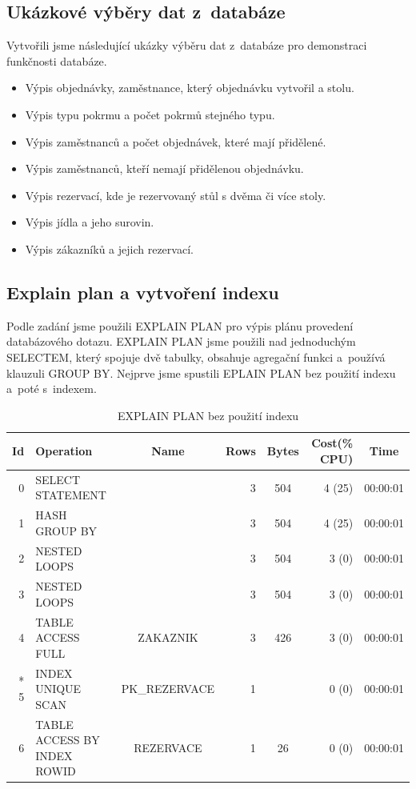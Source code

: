 \documentclass[a4paper, 12pt]{article}
\begin{document}
\subsection{Ukázkové výběry dat z~databáze}
Vytvořili jsme následující ukázky výběru dat z~databáze pro demonstraci funkčnosti databáze.
\begin{itemize}
\item Výpis objednávky, zaměstnance, který objednávku vytvořil a stolu.
\item Výpis typu pokrmu a počet pokrmů stejného typu.
\item Výpis zaměstnanců a počet objednávek, které mají přidělené.
\item Výpis zaměstnanců, kteří nemají přidělenou objednávku.
\item Výpis rezervací, kde je rezervovaný stůl s dvěma či více stoly.
\item Výpis jídla a jeho surovin.
\item Výpis zákazníků a jejich rezervací.
\end{itemize}
\subsection{Explain plan a vytvoření indexu}
Podle zadání jsme použili EXPLAIN PLAN pro výpis plánu provedení databázového dotazu. EXPLAIN PLAN jsme použili nad jednoduchým SELECTEM, který spojuje dvě tabulky, obsahuje agregační funkci a~používá klauzuli GROUP BY. Nejprve jsme spustili EPLAIN PLAN bez použití indexu a~poté s~indexem.
\begin{table}[h]
\small
\begin{tabular}{| r | l | c | r | c | r | c |}
\hline
Id & Operation & Name & Rows & Bytes & Cost(\% CPU) & Time\\
\hline
0 & SELECT STATEMENT &  & 3 & 504 & 4 (25) & 00:00:01\\
\hline
1 & HASH GROUP BY &  & 3 & 504 & 4 (25) & 00:00:01\\
\hline
2 & NESTED LOOPS & & 3 & 504 & 3 (0) & 00:00:01\\
\hline
3 & NESTED LOOPS & & 3 & 504 & 3 (0) & 00:00:01\\
\hline
4 & TABLE ACCESS FULL & ZAKAZNIK & 3 & 426 & 3 (0) & 00:00:01\\
\hline
* 5 & INDEX UNIQUE SCAN & PK\_REZERVACE & 1 & & 0 (0) & 00:00:01\\
\hline
6 & TABLE ACCESS BY INDEX ROWID & REZERVACE & 1 & 26 & 0 (0) & 00:00:01\\
\hline

\end{tabular}
\caption{EXPLAIN PLAN bez použití indexu}
\end{table}
\end{document}

